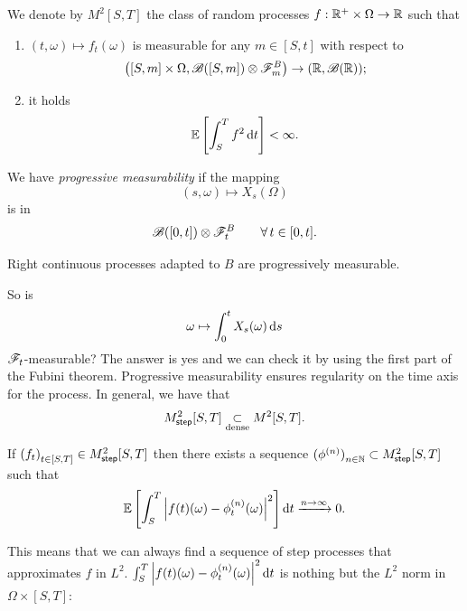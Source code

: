 \documentclass[12pt]{report}
\begin{document}
\begin{definition}
	We denote by $M^{2}[S,T]$ the class of random processes $f:\mathbb{R}^{+}\times\Omega\to\mathbb{R}$ such that
	\begin{enumerate}
		\item $(t,\omega)\mapsto f_{t}(\omega)$ is measurable for any $m\in[S,t]$ with respect to
		\begin{equation*}
			\left([S,m]\times\Omega,\mathscr{B}([S,m])\otimes\mathscr{F}^{B}_{m}\right)\to(\mathbb{R},\mathscr{B}(\mathbb{R}));
		\end{equation*}
		\item it holds
		\begin{equation*}
			\mathbb{E}\left[\int_{S}^{T}f^{2}\mathop{}\!\mathrm{d} t\right]<\infty.
		\end{equation*}
	\end{enumerate}
\end{definition} We have \emph{progressive measurability} if the mapping
\begin{equation*}
	(s,\omega)\mapsto X_{s}(\Omega)
\end{equation*}
is in \begin{equation*}
	\mathscr{B}([0,t])\otimes\mathscr{F}^{B}_{t}\qquad\forall\, t\in[0,t].
\end{equation*}
\begin{proposition}
	Right continuous processes adapted to $B$ are progressively measurable.
\end{proposition}
So is \begin{equation*}
	\omega\mapsto\int_{0}^{t}X_{s}(\omega)\mathop{}\!\mathrm{d} s
\end{equation*}
$\mathscr{F}_{t}$-measurable? The answer is yes and we can check it by using the first part of the Fubini theorem. Progressive measurability ensures regularity on the time axis for the process. In general, we have that
\begin{equation*}
	M^{2}_{\mathsf{step}}[S,T]\underset{\text{dense}}{\subset}M^{2}[S,T].
\end{equation*}
\begin{lemma}
	If ${\left(f_{t}\right)}_{t\in[S,T]}\in M^{2}_{\mathsf{step}}[S,T]$ then there exists a sequence ${(\phi^{(n)})}_{n\in\mathbb{N}}\subset M^{2}_{\mathsf{step}}[S,T]$ such that
	\begin{equation*}
		\mathbb{E}\left[\int_{S}^{T}\left|f(t)(\omega)-\phi^{(n)}_{t}(\omega)\right|^{2}\right]\mathop{}\!\mathrm{d} t\xrightarrow{n\to\infty}0.
	\end{equation*}
\end{lemma}
This means that we can always find a sequence of step processes that approximates $f$ in $L^{2}$. $\int_{S}^{T}\left|f(t)(\omega)-\phi^{(n)}_{t}(\omega)\right|^{2}\mathop{}\!\mathrm{d} t$ is nothing but the $L^{2}$ norm in $\Omega\times[S,T]$:
\end{document}
